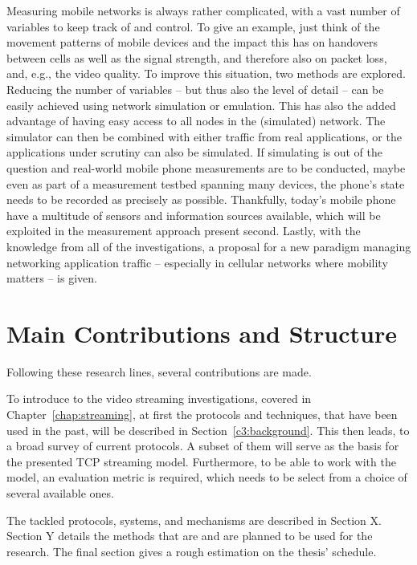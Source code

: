 Measuring mobile networks is always rather complicated, with a vast number of variables to keep track of and control. To give an example, just think of the movement patterns of mobile devices and the impact this has on handovers between cells as well as the signal strength, and therefore also on packet loss, and, e.g., the video quality.
 To improve this situation, two methods are explored. Reducing the number of variables -- but thus also the level of detail -- can be easily achieved using network simulation or emulation. This has also the added advantage of having easy access to all nodes in the (simulated) network. The simulator can then be combined with either traffic from real applications, or the applications under scrutiny can also be simulated.
 If simulating is out of the question and real-world mobile phone measurements are to be conducted, maybe even as part of a measurement testbed spanning many devices, the phone's state needs to be recorded as precisely as possible. Thankfully, today's mobile phone have a multitude of sensors and information sources available, which will be exploited in the measurement approach present second.
 Lastly, with the knowledge from all of the investigations, a proposal for a new paradigm managing networking application traffic -- especially in cellular networks where mobility matters -- is given.



\section{Main Contributions and Structure}

Following these research lines, several contributions are made. 

To introduce to the video streaming investigations, covered in Chapter~\ref{chap:streaming}, at first the protocols and techniques, that have been used in the past, will be described in Section~\ref{c3:background}. This then leads, to a broad survey of current protocols. A subset of them will serve as the basis for the presented \gls{TCP} streaming model. Furthermore, to be able to work with the model, an evaluation metric is required, which needs to be select from a choice of several available ones. 

The tackled protocols, systems, and mechanisms are described in Section X. Section Y details the methods that are and are planned to be used for the research. The final section gives a rough estimation on the thesis' schedule.

